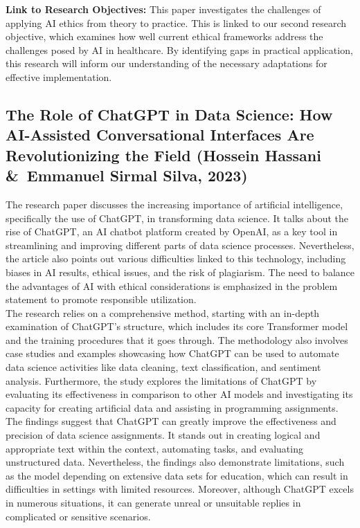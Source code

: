 \documentclass[a4paper, 12pt]{article}
\begin{document}
\textbf{Link to Research Objectives:} This paper investigates the challenges of applying AI ethics from theory to practice. This is linked to our second research objective, which examines how well current ethical frameworks address the challenges posed by AI in healthcare. By identifying gaps in practical application, this research will inform our understanding of the necessary adaptations for effective implementation.


\subsection{The Role of ChatGPT in Data Science: How AI-Assisted Conversational Interfaces Are Revolutionizing the Field (Hossein Hassani \&\ Emmanuel Sirmal Silva, 2023)}
The research paper discusses the increasing importance of artificial intelligence, specifically the use of ChatGPT, in transforming data science. It talks about the rise of ChatGPT, an AI chatbot platform created by OpenAI, as a key tool in streamlining and improving different parts of data science processes. Nevertheless, the article also points out various difficulties linked to this technology, including biases in AI results, ethical issues, and the risk of plagiarism. The need to balance the advantages of AI with ethical considerations is emphasized in the problem statement to promote responsible utilization.\\

The research relies on a comprehensive method, starting with an in-depth examination of ChatGPT's structure, which includes its core Transformer model and the training procedures that it goes through. The methodology also involves case studies and examples showcasing how ChatGPT can be used to automate data science activities like data cleaning, text classification, and sentiment analysis. Furthermore, the study explores the limitations of ChatGPT by evaluating its effectiveness in comparison to other AI models and investigating its capacity for creating artificial data and assisting in programming assignments.\\

The findings suggest that ChatGPT can greatly improve the effectiveness and precision of data science assignments. It stands out in creating logical and appropriate text within the context, automating tasks, and evaluating unstructured data. Nevertheless, the findings also demonstrate limitations, such as the model depending on extensive data sets for education, which can result in difficulties in settings with limited resources. Moreover, although ChatGPT excels in numerous situations, it can generate unreal or unsuitable replies in complicated or sensitive scenarios.\\
\end{document}
